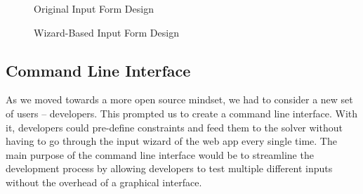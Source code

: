 \documentclass[book]{hmcclinic}
\begin{document}
\begin{figure}[h]
    \centering
    \caption{Original Input Form Design}
\end{figure}
\begin{figure}[h]
    \centering
    \caption{Wizard-Based Input Form Design}
\end{figure}

\subsection{Command Line Interface}
As we moved towards a more open source mindset, we had to consider a new set of users -- developers. This prompted us to create a command line interface. With it, developers could pre-define constraints and feed them to the solver without having to go through the input wizard of the web app every single time. The main purpose of the command line interface would be to streamline the development process by allowing developers to test multiple different inputs without the overhead of a graphical interface. 
\end{document}
